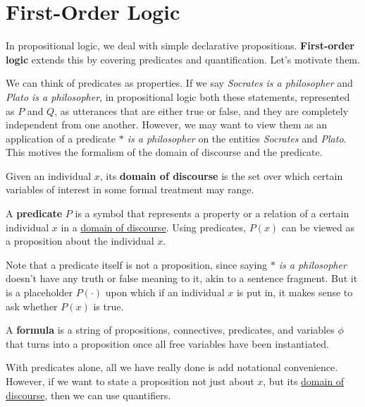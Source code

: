 \section{First-Order Logic} 

  In propositional logic, we deal with simple declarative propositions. \textbf{First-order logic} extends this by covering predicates and quantification. Let's motivate them. 

  We can think of predicates as properties. If we say \textit{Socrates is a philosopher} and \textit{Plato is a philosopher}, in propositional logic both these statements, represented as $P$ and $Q$, as utterances that are either true or false, and they are completely independent from one another. However, we may want to view them as an application of a predicate \textit{ $\ast$ is a philosopher} on the entities \textit{Socrates} and \textit{Plato}. This motives the formalism of the domain of discourse and the predicate. 

  \begin{definition}
    \label{def:domain-of-discourse}
    Given an individual $x$, its \textbf{domain of discourse} is the set over which certain variables of interest in some formal treatment may range. 
  \end{definition}

  \begin{definition}[Predicate]
    \label{def:predicate}
    A \textbf{predicate} $P$ is a symbol that represents a property or a relation of a certain individual $x$ in a \hyperref[def:domain-of-discourse]{domain of discourse}. Using predicates, $P(x)$ can be viewed as a proposition about the individual $x$. 
  \end{definition} 

  Note that a predicate itself is not a proposition, since saying \textit{$\ast$ is a philosopher} doesn't have any truth or false meaning to it, akin to a sentence fragment. But it is a placeholder $P(\cdot)$ upon which if an individual $x$ is put in, it makes sense to ask whether $P(x)$ is true. 

  \begin{definition}[Formula]
    \label{def:formula}
    A \textbf{formula} is a string of propositions, connectives, predicates, and variables $\phi$ that turns into a proposition once all free variables have been instantiated. 
  \end{definition}

  With predicates alone, all we have really done is add notational convenience. However, if we want to state a proposition not just about $x$, but its \hyperref[def:domain-of-discourse]{domain of discourse}, then we can use quantifiers. 

